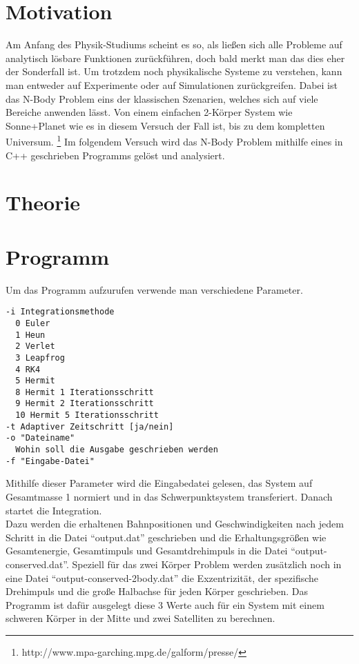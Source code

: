 \section{Motivation}
Am Anfang des Physik-Studiums scheint es so, als ließen
sich alle Probleme auf analytisch lösbare Funktionen zurückführen,
doch bald merkt man das dies eher der Sonderfall ist.
Um trotzdem noch physikalische Systeme zu verstehen, kann
man entweder auf Experimente oder auf Simulationen zurückgreifen.
Dabei ist das N-Body Problem eins der klassischen Szenarien, welches sich auf
viele Bereiche anwenden l\"asst. Von einem einfachen 2-Körper System wie Sonne+Planet
wie es in diesem Versuch der Fall ist, bis zu dem kompletten Universum.
\footnote{\label{foot:2}http://www.mpa-garching.mpg.de/galform/presse/}
\newline
Im folgendem Versuch wird das N-Body Problem mithilfe eines in C++
geschrieben Programms gelöst und analysiert.
\section{Theorie}
\section{Programm}
Um das Programm aufzurufen verwende man verschiedene Parameter.
\lstset{language=Bash,
  basicstyle=\small \ttfamily,
  showspaces=false,
  showtabs=false,
  tab= ,
  keywordstyle=\bfseries,
  showstringspaces=false,
  framexleftmargin=0mm,
  frame=single,
  texcl=true}
\begin{lstlisting}
-i Integrationsmethode
  0 Euler
  1 Heun
  2 Verlet
  3 Leapfrog
  4 RK4
  5 Hermit
  8 Hermit 1 Iterationsschritt
  9 Hermit 2 Iterationsschritt
  10 Hermit 5 Iterationsschritt
-t Adaptiver Zeitschritt [ja/nein]
-o "Dateiname"
  Wohin soll die Ausgabe geschrieben werden
-f "Eingabe-Datei"
\end{lstlisting}
Mithilfe dieser Parameter wird die Eingabedatei gelesen, das System auf Gesamtmasse 1 normiert
und in das Schwerpunktsystem transferiert. Danach startet die Integration.\\
Dazu werden die erhaltenen Bahnpositionen und Geschwindigkeiten nach jedem Schritt in die Datei ``output.dat'' geschrieben
und die Erhaltungsgrößen wie Gesamtenergie, Gesamtimpuls und Gesamtdrehimpuls in die Datei ``output-conserved.dat''.
Speziell für das zwei Körper Problem werden zusätzlich noch in eine Datei ``output-conserved-2body.dat''
die Exzentrizität, der spezifische Drehimpuls und die große Halbachse für jeden Körper geschrieben.
Das Programm ist dafür ausgelegt diese 3 Werte auch für ein System mit einem schweren
Körper in der Mitte und zwei Satelliten zu berechnen.\\
